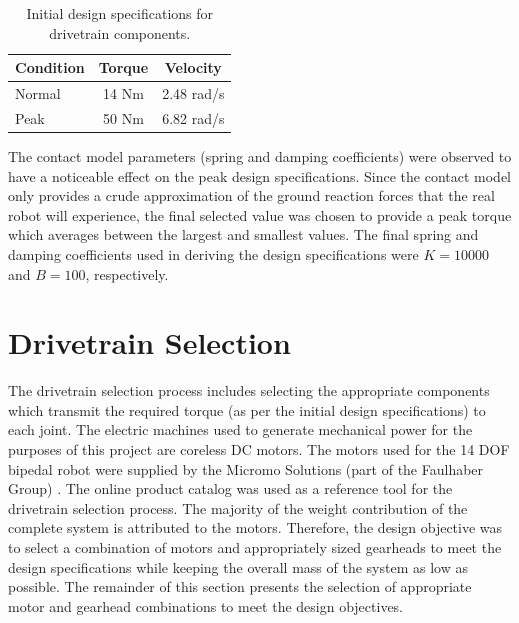 \begin{table}[!h]
  \centering
  \caption{Initial design specifications for drivetrain components.}
    \begin{tabular}{lcc}
    \addlinespace
    \toprule
    \textbf{Condition} & \textbf{Torque} & \textbf{Velocity}\\
    \midrule
    Normal & 14 Nm & 2.48 rad/s\\
    Peak  & 50 Nm & 6.82 rad/s \\
    \bottomrule
    \end{tabular}%
  \label{tab:spectable}%
\end{table}%

The contact model parameters (spring and damping coefficients) were observed to have a noticeable effect on the peak design specifications. Since the contact model only provides a crude approximation of the ground reaction forces that the real robot will experience, the final selected value was chosen to provide a peak torque which averages between the largest and smallest values. The final spring and damping coefficients used in deriving the design specifications were $K = 10000$ and $B = 100$, respectively.




\section{Drivetrain Selection} %
\label{sec:drivetrain}
The drivetrain selection process includes selecting the appropriate components which transmit the required torque (as per the initial design specifications) to each joint. The electric machines used to generate mechanical power for the purposes of this project are coreless DC motors. The motors used for the 14 DOF bipedal robot were supplied by the Micromo Solutions (part of the Faulhaber Group) \cite{sw:micromo}. The online product catalog was used as a reference tool for the drivetrain selection process. The majority of the weight contribution of the complete system is attributed to the motors. Therefore, the design objective was to select a combination of motors and appropriately sized gearheads to meet the design specifications while keeping the overall mass of the system as low as possible. The remainder of this section presents the selection of appropriate motor and gearhead combinations to meet the design objectives. 

